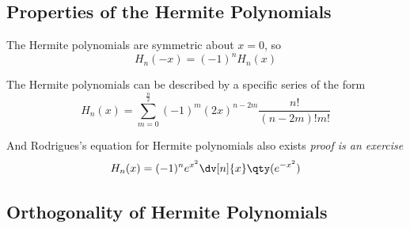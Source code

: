 \subsection{Properties of the Hermite Polynomials}
\label{sec:hermiteprops}

The Hermite polynomials are symmetric about $x=0$, so
\begin{equation}
  \label{eq:parityhermite}
  H_n(-x) = (-1)^n H_n(x)
\end{equation}

The Hermite polynomials can be described by a specific series of the form
\begin{equation}
  \label{eq:hermiteseriesspef}
  H_n(x) = \sum_{m=0}^{\frac{n}{2}}(-1)^m (2x)^{n-2m} \frac{n!}{(n-2m)!m!}
\end{equation}

And Rodrigues's equation for Hermite polynomials also exists
{\em proof is an exercise}
\begin{equation}
  \label{eq:rodrigueshermite}
  H_n(x) = (-1)^n e^{x^2} \dv[n]{x} \qty(e^{-x^2})
\end{equation}

\subsection{Orthogonality of Hermite Polynomials}
\label{sec:orth-herm-polyn}

